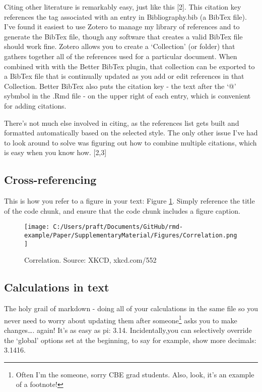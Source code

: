 \documentclass[]{elsarticle} %
\makeatletter
\def\maxwidth{\ifdim\Gin@nat@width>\linewidth\linewidth
\else\Gin@nat@width\fi}
\let\Oldincludegraphics\includegraphics
\renewcommand{\includegraphics}[1]{\Oldincludegraphics[width=\maxwidth]{#1}}
\theoremstyle{definition}
\theoremstyle{definition}
\theoremstyle{definition}
\theoremstyle{remark}
\makeatother
\begin{document}
Citing other literature is remarkably easy, just like this {[}2{]}. This
citation key references the tag associated with an entry in
Bibliography.bib (a BibTex file). I've found it easiest to use Zotero to
manage my library of references and to generate the BibTex file, though
any software that creates a valid BibTex file should work fine. Zotero
allows you to create a `Collection' (or folder) that gathers together
all of the references used for a particular document. When combined with
with the Better BibTex plugin, that collection can be exported to a
BibTex file that is continually updated as you add or edit references in
that Collection. Better BibTex also puts the citation key - the text
after the `@' sybmbol in the .Rmd file - on the upper right of each
entry, which is convenient for adding citations.

There's not much else involved in citing, as the references list gets
built and formatted automatically based on the selected style. The only
other issue I've had to look around to solve was figuring out how to
combine multiple citations, which is easy when you know how. {[}2,3{]}

\hypertarget{cross-referencing}{%
\subsection{Cross-referencing}\label{cross-referencing}}

This is how you refer to a figure in your text: Figure
\ref{fig:correlation}. Simply reference the title of the code chunk, and
ensure that the code chunk includes a figure caption.

\begin{figure}
\centering
\texttt{[image: C:/Users/praft/Documents/GitHub/rmd-example/Paper/SupplementaryMaterial/Figures/Correlation.png]}
\caption{\label{fig:correlation}Correlation. Source: XKCD, xkcd.com/552}
\end{figure}

\hypertarget{calculations-in-text}{%
\subsection{Calculations in text}\label{calculations-in-text}}

The holy grail of markdown - doing all of your calculations in the same
file so you never need to worry about updating them after
someone\footnote{Often I'm the someone, sorry CBE grad students. Also,
  look, it's an example of a footnote!} asks you to make
changes\ldots{}. again! It's as easy as pi: 3.14. Incidentally,you can
selectively override the `global' options set at the beginning, to say
for example, show more decimals: 3.1416.
\end{document}
